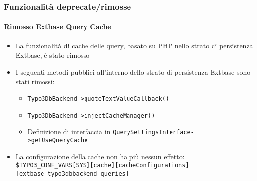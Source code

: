 \begin{frame}[fragile]
	\frametitle{Funzionalità deprecate/rimosse}
	\framesubtitle{Rimosso Extbase Query Cache}

	\begin{itemize}

		\item La funzionalità di cache delle query, basato su PHP nello strato di persistenza Extbase, è stato rimosso

		\item I seguenti metodi pubblici all'interno dello strato di persistenza Extbase sono stati rimossi:

			\begin{itemize}
				\item \small\texttt{Typo3DbBackend->quoteTextValueCallback()}\normalsize
				\item \small\texttt{Typo3DbBackend->injectCacheManager()}\normalsize
				\item Definizione di interfaccia in \small\texttt{QuerySettingsInterface->getUseQueryCache}\normalsize
			\end{itemize}

		\item La configurazione della cache non ha più nessun effetto:\newline
			\smaller
				\texttt{\$TYPO3\_CONF\_VARS[SYS][cache][cacheConfigurations]}\newline
				\tabto{0.4cm}\texttt{[extbase\_typo3dbbackend\_queries]}
			\normalsize

	\end{itemize}

\end{frame}


